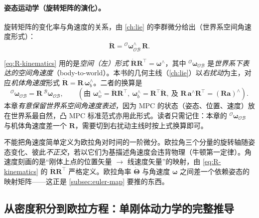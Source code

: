 \paragraph{ 姿态运动学（旋转矩阵的演化）。}
旋转矩阵的变化率与角速度的关系，由 \cref{ch:lie} 的李群微分给出（世界系空间角速度形式）\cite{dicarlo2018cheetah,gaoxiang2019slam14}：
\begin{equation}
  \dot{\mathbf{R}}={}^{\mathcal{O}}\boldsymbol{\omega}_{\mathcal{OB}}^{\wedge}\,\mathbf{R}.
  \label{eq:R-kinematics}
\end{equation}

\begin{note}[空间角速度与本书右扰动主线的换算]\label{note:spatial-omega}
\cref{eq:R-kinematics} 用的是\emph{空间（左）形式} $\dot{\mathbf{R}}\mathbf{R}^\top=\boldsymbol{\omega}^\wedge$，其中 ${}^{\mathcal{O}}\boldsymbol{\omega}_{\mathcal{OB}}$ 是\emph{世界系下表达的空间角速度}（body-to-world）。本书的几何主线（\cref{ch:lie}）以\emph{右扰动}为主，对应\emph{机体角速度}形式 $\dot{\mathbf{R}}=\mathbf{R}\,\boldsymbol{\omega}_b^\wedge$。二者的换算是
\[
  {}^{\mathcal{O}}\boldsymbol{\omega}_{\mathcal{OB}}=\mathbf{R}\,{}^{\mathcal{B}}\boldsymbol{\omega}_{\mathcal{OB}},
  \qquad(\text{由 } \boldsymbol{\omega}_w^\wedge=\dot{\mathbf{R}}\mathbf{R}^\top,\ \boldsymbol{\omega}_b^\wedge=\mathbf{R}^\top\dot{\mathbf{R}},\ \text{及 } \mathbf{R}\,\mathbf{a}^\wedge\mathbf{R}^\top=(\mathbf{R}\mathbf{a})^\wedge).
\]
本章\emph{有意保留世界系空间角速度表述}，因为 MPC 的状态（姿态、位置、速度）放在世界系最自然，凸 MPC 标准范式亦用此形式。读者只需记住：本章的 ${}^{\mathcal{O}}\boldsymbol{\omega}_{\mathcal{OB}}$ 与机体角速度差一个 $\mathbf{R}$，需要切到右扰动主线时按上式换算即可。
\end{note}

\begin{pitfall}[误区：把角速度当成欧拉角的导数 $\boldsymbol{\omega}=\dot{\boldsymbol{\Theta}}$]
不能把角速度简单定义为欧拉角对时间的一阶微分。欧拉角三个分量的旋转轴随姿态变化、彼此\emph{不正交}，若以它们为基描述角速度会违背物理（牛顿第一定律）。角速度刻画的是“刚体上点的位置矢量 $\to$ 线速度矢量”的映射，由 \cref{eq:R-kinematics} 的 $\dot{\mathbf{R}}\mathbf{R}^\top$ 严格定义。欧拉角率 $\dot{\boldsymbol{\Theta}}$ 与角速度 $\boldsymbol{\omega}$ 之间差一个依赖姿态的映射矩阵——这正是 \cref{subsec:euler-map} 要推的东西。
\end{pitfall}

\subsection{从密度积分到欧拉方程：单刚体动力学的完整推导}
\label{subsec:srbd-full-derivation}

